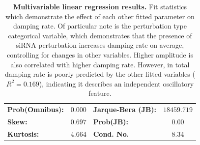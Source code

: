\documentclass[11pt, letterpaper]{article}
\begin{document}
\begin{table}
\begin{center}
\begin{tabular}{lclc}
\textbf{Prob(Omnibus):} &$  0.000 $& \textbf{  Jarque-Bera (JB):  } &$18459.719$ \\
\textbf{Skew:}          &$  0.697 $& \textbf{  Prob(JB):          } &$     0.00$ \\
\textbf{Kurtosis:}      &$  4.664 $& \textbf{  Cond. No.          } &$     8.34$ \\
\bottomrule
\end{tabular}
\end{center} 
\caption{{\bfseries Multivariable linear regression results.} Fit statistics which demonstrate the effect of each other fitted parameter on damping rate. Of particular note is the perturbation type categorical variable, which demonstrates that the presence of siRNA perturbation increases damping rate on average, controlling for changes in other variables. Higher amplitude is also correlated with higher damping rate. However, in total damping rate is poorly predicted by the other fitted variables ($R^2 = 0.169$), indicating it describes an independent oscillatory feature.}
\label{tab:ols_reg}
\end{table}
\end{document}

